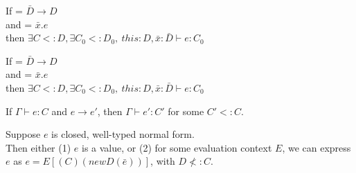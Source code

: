 \begin{theorem}
    If  = $\bar{D} \rightarrow D$ \\
            and  = $\bar{x}.e$\\
            then $\exists C <: D, \exists C_0 <: D_0,~this: D, \bar{x}: \bar{D}\vdash e: C_0$
\end{theorem}



\begin{theorem}
    If  = $\bar{D} \rightarrow D$ \\
            and  = $\bar{x}.e$\\
            then $\exists C <: D, \exists C_0 <: D_0,~this: D, \bar{x}: \bar{D}\vdash e: C_0$
\end{theorem}

\begin{theorem}[Preservation]
    If $\Gamma \vdash e : C$ and $e \rightarrow e'$,
    then $\Gamma \vdash e': C'$ for some $C' <: C$.
\end{theorem}

\begin{theorem}[Progress]
    Suppose $e$ is closed, well-typed normal form.\\
    Then either (1) $e$ is a value, or (2) for some evaluation context $E$, we can
    express $e$ as $e = E[(C)(new D(\bar{e}))]$, with $D \nless: C$.
\end{theorem}


